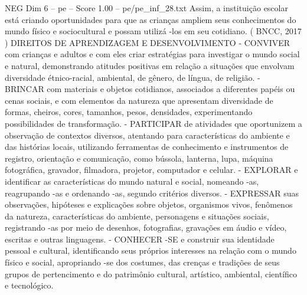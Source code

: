 \begin{textsample}{NEG Dim 6 – pe – Score 1.00 – pe/pe\_inf\_28.txt}
Assim, a instituição escolar está criando oportunidades para que as crianças ampliem seus conhecimentos do mundo físico e sociocultural e possam utilizá -los em seu cotidiano. ( BNCC, 2017 ) DIREITOS DE APRENDIZAGEM E DESENVOLVIMENTO - CONVIVER com crianças e adultos e com eles criar estratégias para investigar o mundo social e natural, demonstrando atitudes positivas em relação a situações que envolvam diversidade étnico-racial, ambiental, de gênero, de língua, de religião. - BRINCAR com materiais e objetos cotidianos, associados a diferentes papéis ou cenas sociais, e com elementos da natureza que apresentam diversidade de formas, cheiros, cores, tamanhos, pesos, densidades, experimentando possibilidades de transformação. - PARTICIPAR de atividades que oportunizem a observação de contextos diversos, atentando para características do ambiente e das histórias locais, utilizando ferramentas de conhecimento e instrumentos de registro, orientação e comunicação, como bússola, lanterna, lupa, máquina fotográfica, gravador, filmadora, projetor, computador e celular. - EXPLORAR e identificar as características do mundo natural e social, nomeando -as, reagrupando -as e ordenando -as, segundo critérios diversos. - EXPRESSAR suas observações, hipóteses e explicações sobre objetos, organismos vivos, fenômenos da natureza, características do ambiente, personagens e situações sociais, registrando -as por meio de desenhos, fotografias, gravações em áudio e vídeo, escritas e outras linguagens. - CONHECER -SE e construir sua identidade pessoal e cultural, identificando seus próprios interesses na relação com o mundo físico e social, apropriando -se dos costumes, das crenças e tradições de seus grupos de pertencimento e do patrimônio cultural, artístico, ambiental, científico e tecnológico.

\end{textsample}
